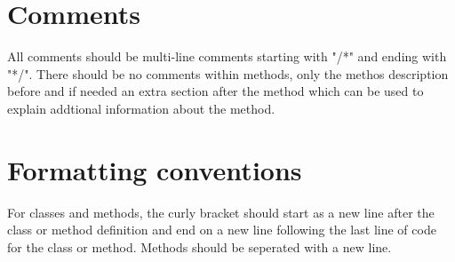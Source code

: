 \documentclass{article}
\begin{document}
    \section{Comments}
        \begin{flushleft}
            All comments should be multi-line comments starting with "/*" and ending with "*/". There should be no comments within methods, only the methos description before and if needed an extra section after the method which can be used to explain addtional information about the method.
        \end{flushleft}
        
        \newpage
    \section{Formatting conventions}
        \begin{flushleft}
            For classes and methods, the curly bracket should start as a new line after the class or method definition and end on a new line following the last line of code for the class or method. Methods should be seperated with a new line.
        \end{flushleft}
\end{document}
